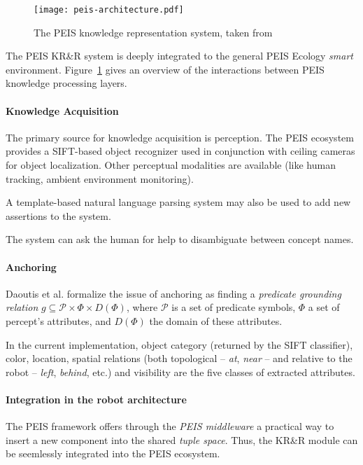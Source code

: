 \documentclass[a4paper, twocolumn]{article}
\begin{document}

\begin{figure}
	\centering
	\texttt{[image: peis-architecture.pdf]}
	\caption{The PEIS knowledge representation system, taken from~\cite{Daoutis2009}}
	\label{fig|peis-archi}
\end{figure}

The PEIS KR\&R system is deeply integrated to the general PEIS Ecology
\emph{smart} environment. Figure~\ref{fig|peis-archi} gives an overview of the
interactions between PEIS knowledge processing layers.

\paragraph{Knowledge Acquisition} The primary source for knowledge acquisition
is perception.  The PEIS ecosystem provides a SIFT-based object recognizer used
in conjunction with ceiling cameras for object localization.  Other perceptual
modalities are available (like human tracking, ambient environment monitoring).

A template-based natural language parsing system may also be used to add new
assertions to the system.

The system can ask the human for help to disambiguate between concept names.

\paragraph{Anchoring} Daoutis et al. formalize the issue of anchoring as
finding a \emph{predicate grounding relation} $g \subseteq \mathcal{P} \times
\Phi \times D(\Phi)$, where $\mathcal{P}$ is a set of predicate symbols, $\Phi$
a set of percept's attributes, and $D(\Phi)$ the domain of these attributes.

In the current implementation, object category (returned by the SIFT
classifier), color, location, spatial relations (both topological -- \emph{at},
\emph{near} -- and relative to the robot -- \emph{left}, \emph{behind}, etc.)
and visibility are the five classes of extracted attributes.

\paragraph{Integration in the robot architecture}
\label{sect|peis-integration}

The PEIS framework offers through the \emph{PEIS middleware} a practical way to
insert a new component into the shared \emph{tuple space}.  Thus, the KR\&R
module can be seemlessly integrated into the PEIS ecosystem.
\end{document}
